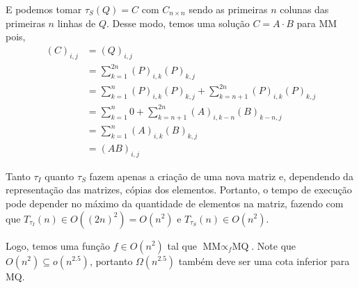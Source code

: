E podemos tomar $\tau_S(Q) = C$ com $C_{n \times n}$ sendo as primeiras $n$ colunas das primeiras $n$ linhas de $Q$. Desse modo, temos uma solução $C = A \cdot B$ para MM pois,
\begin{align*}
    (C)_{i,j} &= (Q)_{i,j} \\
        &= \sum_{k = 1}^{2n} (P)_{i,k} (P)_{k,j} \\
        &= \sum_{k = 1}^{n} (P)_{i,k} (P)_{k,j} + \sum_{k = n + 1}^{2n} (P)_{i,k} (P)_{k,j} \\
        &= \sum_{k = 1}^{n} 0 + \sum_{k = n + 1}^{2 n} (A)_{i,k-n} (B)_{k-n,j} \\
        &= \sum_{k = 1}^{n} (A)_{i,k} (B)_{k,j} \\
        &= (A B)_{i,j}
\end{align*}

Tanto $\tau_I$ quanto $\tau_S$ fazem apenas a criação de uma nova matriz e, dependendo da representação das matrizes, cópias dos elementos. Portanto, o tempo de execução pode depender no máximo da quantidade de elementos na matriz, fazendo com que $T_{\tau_I}(n) \in O\left(\left(2n\right)^2\right) = O\left(n^2\right)$ e $T_{\tau_S}(n) \in O\left(n^2\right)$.

Logo, temos uma função $f \in O\left(n^2\right)$ tal que $\text{MM} \propto_f \text{MQ}$. Note que $O\left(n^2\right) \subseteq o\left(n^{2.5}\right)$, portanto $\Omega\left(n^{2.5}\right)$ também deve ser uma cota inferior para MQ.
